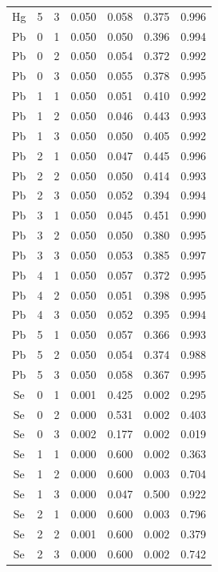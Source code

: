 \documentclass[ms, hidelinks]{uncgdissertationexp}
\theoremstyle{plain}
\theoremstyle{definition}
\theoremstyle{remark}
\begin{document}
\begin{longtable}{ccccccc}
Hg & 5 & 3 & 0.050 & 0.058 & 0.375 & 0.996\\
\rowcolor{gray!6}  Pb & 0 & 1 & 0.050 & 0.050 & 0.396 & 0.994\\
Pb & 0 & 2 & 0.050 & 0.054 & 0.372 & 0.992\\
\rowcolor{gray!6}  Pb & 0 & 3 & 0.050 & 0.055 & 0.378 & 0.995\\
Pb & 1 & 1 & 0.050 & 0.051 & 0.410 & 0.992\\
\rowcolor{gray!6}  Pb & 1 & 2 & 0.050 & 0.046 & 0.443 & 0.993\\
Pb & 1 & 3 & 0.050 & 0.050 & 0.405 & 0.992\\
\rowcolor{gray!6}  Pb & 2 & 1 & 0.050 & 0.047 & 0.445 & 0.996\\
Pb & 2 & 2 & 0.050 & 0.050 & 0.414 & 0.993\\
\rowcolor{gray!6}  Pb & 2 & 3 & 0.050 & 0.052 & 0.394 & 0.994\\
Pb & 3 & 1 & 0.050 & 0.045 & 0.451 & 0.990\\
\rowcolor{gray!6}  Pb & 3 & 2 & 0.050 & 0.050 & 0.380 & 0.995\\
Pb & 3 & 3 & 0.050 & 0.053 & 0.385 & 0.997\\
\rowcolor{gray!6}  Pb & 4 & 1 & 0.050 & 0.057 & 0.372 & 0.995\\
Pb & 4 & 2 & 0.050 & 0.051 & 0.398 & 0.995\\
\rowcolor{gray!6}  Pb & 4 & 3 & 0.050 & 0.052 & 0.395 & 0.994\\
Pb & 5 & 1 & 0.050 & 0.057 & 0.366 & 0.993\\
\rowcolor{gray!6}  Pb & 5 & 2 & 0.050 & 0.054 & 0.374 & 0.988\\
Pb & 5 & 3 & 0.050 & 0.058 & 0.367 & 0.995\\
\rowcolor{gray!6}  Se & 0 & 1 & 0.001 & 0.425 & 0.002 & 0.295\\
Se & 0 & 2 & 0.000 & 0.531 & 0.002 & 0.403\\
\rowcolor{gray!6}  Se & 0 & 3 & 0.002 & 0.177 & 0.002 & 0.019\\
Se & 1 & 1 & 0.000 & 0.600 & 0.002 & 0.363\\
\rowcolor{gray!6}  Se & 1 & 2 & 0.000 & 0.600 & 0.003 & 0.704\\
Se & 1 & 3 & 0.000 & 0.047 & 0.500 & 0.922\\
\rowcolor{gray!6}  Se & 2 & 1 & 0.000 & 0.600 & 0.003 & 0.796\\
Se & 2 & 2 & 0.001 & 0.600 & 0.002 & 0.379\\
\rowcolor{gray!6}  Se & 2 & 3 & 0.000 & 0.600 & 0.002 & 0.742\\

\end{longtable}
\end{document}
